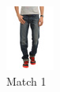 \begin{figure}[H]
  \centering
  \begin{subfigure}[b]{0.19\textwidth}
      \includegraphics[width=\textwidth]{images/output1.jpeg}
      \caption{Match 1}
  \end{subfigure}
  \begin{subfigure}[b]{0.19\textwidth}

\end{subfigure}
\end{figure}
